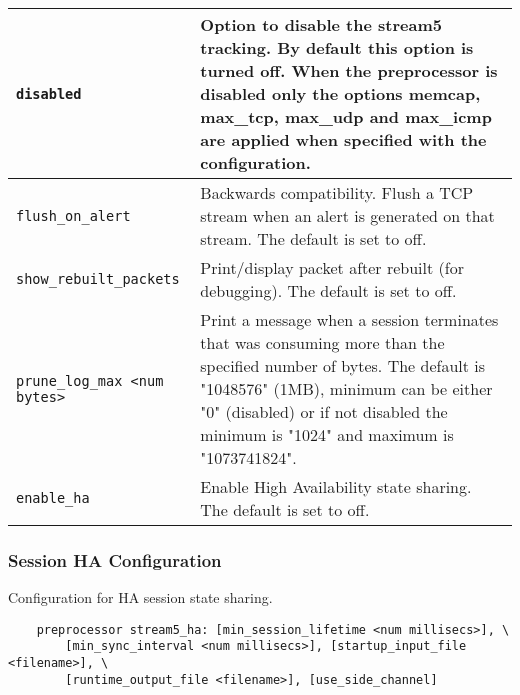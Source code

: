 \documentclass[english]{report}
\begin{document}
\begin{center}
\begin{tabular}{| l | p{4.5in} |}
\hline 
\texttt{disabled} &

Option to disable the stream5 tracking. By default this option is turned off.
When the preprocessor is disabled only the options memcap, max\_tcp, max\_udp 
and max\_icmp are applied when specified with the configuration.\\

\hline
\texttt{flush\_on\_alert} &

Backwards compatibility.  Flush a TCP stream when an alert is generated on that
stream.  The default is set to off.\\

\hline
\texttt{show\_rebuilt\_packets} &

Print/display packet after rebuilt (for debugging).  The default is set to
off.\\

\hline
\texttt{prune\_log\_max <num bytes>} &

Print a message when a session terminates that was consuming more than the
specified number of bytes.  The default is "1048576" (1MB), minimum can be either "0"
(disabled) or if not disabled the minimum is "1024" and maximum is "1073741824".\\

\hline
\texttt{enable\_ha} &


Enable High Availability state sharing.  The default is set to off.\\

\hline
\end{tabular}
\end{center}

\subsubsection{Session HA Configuration}

Configuration for HA session state sharing.

\begin{verbatim}
    preprocessor stream5_ha: [min_session_lifetime <num millisecs>], \
        [min_sync_interval <num millisecs>], [startup_input_file <filename>], \
        [runtime_output_file <filename>], [use_side_channel]
\end{verbatim}
\end{document}
